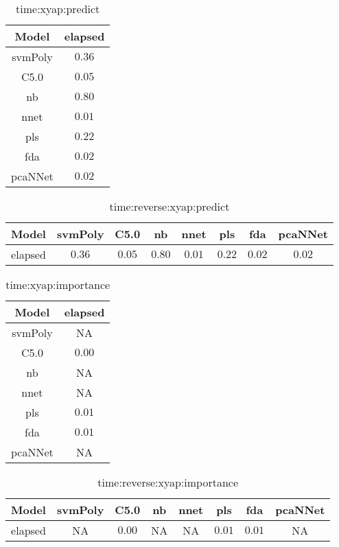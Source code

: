 \begin{table}[!ht]
	\centering
	\begin{tabular}{|c|c|}
		\hline
		Model & elapsed \\ \hline
		svmPoly & $0.36$ \\ \hline
		C5.0 & $0.05$ \\ \hline
		nb & $0.80$ \\ \hline
		nnet & $0.01$ \\ \hline
		pls & $0.22$ \\ \hline
		fda & $0.02$ \\ \hline
		pcaNNet & $0.02$ \\ \hline
	\end{tabular}
	\caption{time:xyap:predict}
	\label{tab:time:xyap:predict}
\end{table}

\begin{table}[!ht]
	\centering
	\begin{tabular}{|c|c|c|c|c|c|c|c|}
		\hline
		Model & svmPoly & C5.0 & nb & nnet & pls & fda & pcaNNet \\ \hline
		elapsed & $0.36$ & $0.05$ & $0.80$ & $0.01$ & $0.22$ & $0.02$ & $0.02$ \\ \hline
	\end{tabular}
	\caption{time:reverse:xyap:predict}
	\label{tab:time:reverse:xyap:predict}
\end{table}

\begin{table}[!ht]
	\centering
	\begin{tabular}{|c|c|}
		\hline
		Model & elapsed \\ \hline
		svmPoly & NA \\ \hline
		C5.0 & $0.00$ \\ \hline
		nb & NA \\ \hline
		nnet & NA \\ \hline
		pls & $0.01$ \\ \hline
		fda & $0.01$ \\ \hline
		pcaNNet & NA \\ \hline
	\end{tabular}
	\caption{time:xyap:importance}
	\label{tab:time:xyap:importance}
\end{table}

\begin{table}[!ht]
	\centering
	\begin{tabular}{|c|c|c|c|c|c|c|c|}
		\hline
		Model & svmPoly & C5.0 & nb & nnet & pls & fda & pcaNNet \\ \hline
		elapsed & NA & $0.00$ & NA & NA & $0.01$ & $0.01$ & NA \\ \hline
	\end{tabular}
	\caption{time:reverse:xyap:importance}
	\label{tab:time:reverse:xyap:importance}
\end{table}

